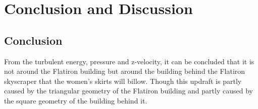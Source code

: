 \section{Conclusion and Discussion}
\subsection{Conclusion}
From the turbulent energy, pressure and z-velocity, it can be concluded that it is not around the Flatiron building but around the building behind the Flatiron skyscraper that the women's skirts will billow. Though this updraft is partly caused by the triangular geometry of the Flatiron building and partly caused by the square geometry of the building behind it. 